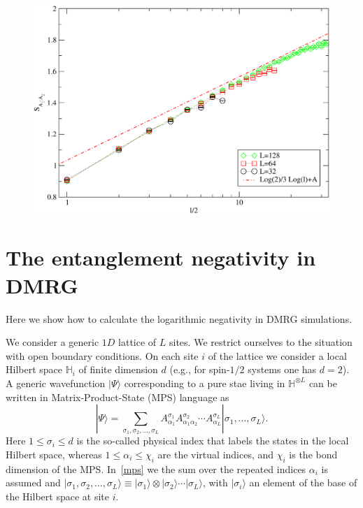 \documentclass[twocolumn,superscriptaddress,prb,10pt]{revtex4-1}
\begin{document}
\begin{figure}[t]
\includegraphics*[width=0.99\linewidth]{./draft_figs/rXX_exact}
\caption{
}
\label{fig1}
\end{figure}

\section{The entanglement negativity in DMRG}
\label{neg-dmrg}

Here we show how to calculate the logarithmic negativity in DMRG simulations. 

We consider a generic $1D$ lattice of $L$ sites. We restrict ourselves to the 
situation with open boundary conditions. On each site $i$ of the lattice we 
consider a local Hilbert space $\mathbb{H}_i$ of finite dimension $d$ (e.g., for 
spin-$1/2$ systems one has $d=2$). A generic wavefunction $|\Psi\rangle$ corresponding 
to a pure stae living in $\mathbb{H}^{\otimes L}$ can be written in Matrix-Product-State 
(MPS) language as 
%
\begin{equation}
|\Psi\rangle=\sum\limits_{\sigma_1,\sigma_2,\dots,\sigma_L}A^{\sigma_1}_{\alpha_1}
A^{\sigma_2}_{\alpha_1\alpha_2}\cdots A^{\sigma_L}_{\alpha_L}|\sigma_1,\dots,
\sigma_L\rangle.
\label{mps} 
\end{equation}
%
Here $1\le\sigma_i\le d$ is the so-called physical index that labels the states 
in the local Hilbert space, whereas $1\le\alpha_i\le\chi_i$ are the virtual 
indices, and $\chi_i$ is the bond dimension of the MPS. In~\eqref{mps} we the sum 
over the repeated indices $\alpha_i$ is assumed and $|\sigma_1,\sigma_2,\dots,
\sigma_L\rangle\equiv|\sigma_1\rangle\otimes|\sigma_2\rangle\cdots|\sigma_L\rangle$, 
with $|\sigma_i\rangle$ an element of the base of the Hilbert space at site 
$i$. 
\end{document}
